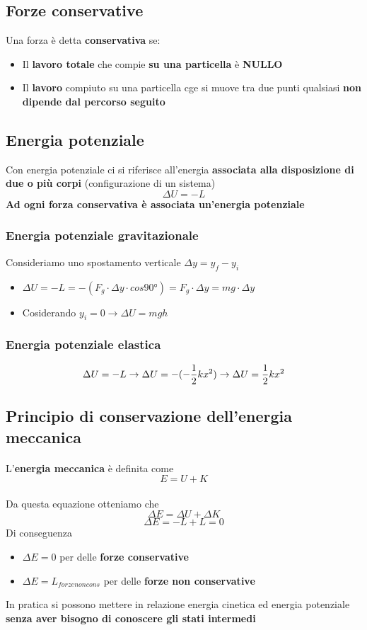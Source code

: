 \documentclass[12pt]{article}
\begin{document}
    \subsection{Forze conservative}
    Una forza è detta \textbf{conservativa} se:
    \begin{itemize}
        \item Il \textbf{lavoro totale} che compie \textbf{su una particella} è \textbf{NULLO}
        \item Il \textbf{lavoro} compiuto su una particella cge si muove tra due punti qualsiasi \textbf{non dipende dal percorso seguito}
    \end{itemize}
    \subsection{Energia potenziale}
    Con energia potenziale ci si riferisce all'energia \textbf{associata alla disposizione di due o più corpi} (configurazione di un sistema)
    $$\Delta U = -L$$
    \textbf{Ad ogni forza conservativa è associata un'energia potenziale}
    \subsubsection{Energia potenziale gravitazionale}
    Consideriamo uno spostamento verticale $\Delta y = y_f - y_i$
    \begin{itemize}
        \item $\Delta U = -L = -(F_g \cdot \Delta y \cdot cos\ang{90}) = F_g \cdot \Delta y = mg \cdot \Delta y$  
        \item Cosiderando $y_i=0 \rightarrow \Delta U = mgh$ 
    \end{itemize}
    \subsubsection{Energia potenziale elastica}
    $$\Delta U = -L \rightarrow \Delta U = -(-{1 \over 2}kx^2) \rightarrow \Delta U = {1 \over 2}kx^2$$
    \newpage
    \subsection{Principio di conservazione dell'energia meccanica}
    \paragraph{} L'\textbf{energia meccanica} è definita come $$E = U + K$$
    \paragraph{} Da questa equazione otteniamo che $$\Delta E = \Delta U + \Delta K$$
    $$\Delta E = - L + L = 0$$
    Di conseguenza \begin{itemize}
        \item $\Delta E = 0$ per delle \textbf{forze conservative}
        \item $\Delta E = L_{forze non cons}$ per delle \textbf{forze non conservative}
    \end{itemize}
    In pratica si possono mettere in relazione energia cinetica ed energia potenziale \textbf{senza aver bisogno di conoscere gli stati intermedi}
    \newpage
\end{document}
